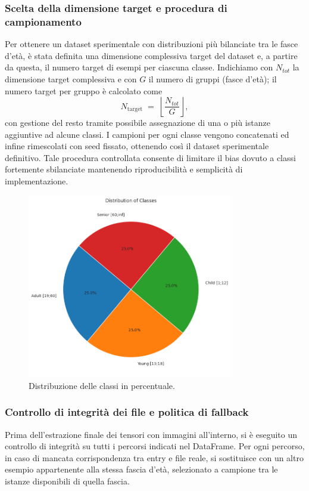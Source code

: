\documentclass[a4paper,12pt]{report}
\begin{document}
	\subsubsection{Scelta della dimensione target e procedura di campionamento}
	Per ottenere un dataset sperimentale con distribuzioni più bilanciate tra le fasce d'età, è stata definita una dimensione complessiva target del dataset e, a partire da questa, il numero target di esempi per ciascuna classe. Indichiamo con \(N_{tot}\) la dimensione target complessiva e con \(G\) il numero di gruppi (fasce d'età); il numero target per gruppo è calcolato come
	\[
	N_{\text{target}} \;=\; \left\lfloor \frac{N_{tot}}{G} \right\rfloor,
	\]
	con gestione del resto tramite possibile assegnazione di una o più istanze aggiuntive ad alcune classi. I campioni per ogni classe vengono concatenati ed infine rimescolati con seed fissato, ottenendo così il dataset sperimentale definitivo. Tale procedura controllata consente di limitare il bias dovuto a classi fortemente sbilanciate mantenendo riproducibilità e semplicità di implementazione.
	
	\begin{figure}[H]
		\centering
		\includegraphics[width=0.8\textwidth]{img/pie_agegroup_image.png}
		\caption{Distribuzione delle classi in percentuale.}
	\end{figure}
	
	\subsubsection{Controllo di integrità dei file e politica di fallback}
	Prima dell'estrazione finale dei tensori con immagini all'interno, si è eseguito un controllo di integrità su tutti i percorsi indicati nel DataFrame. Per ogni percorso, in caso di mancata corrispondenza tra entry e file reale, si sostituisce con un altro esempio appartenente alla stessa fascia d'età, selezionato a campione tra le istanze disponibili di quella fascia.
	
\end{document}
